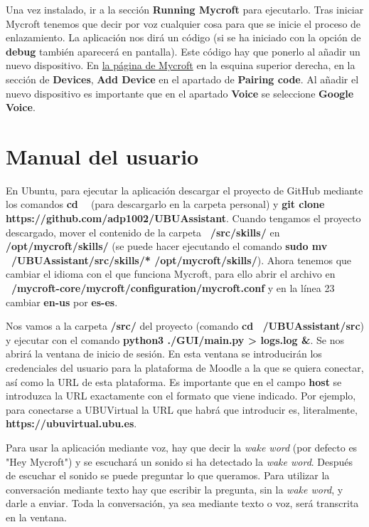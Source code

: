 Una vez instalado, ir a la sección \textbf{Running Mycroft} para ejecutarlo. Tras iniciar Mycroft tenemos que decir por voz cualquier cosa para que se inicie el proceso de enlazamiento. La aplicación nos dirá un código (si se ha iniciado con la opción de \textbf{debug} también aparecerá en pantalla). Este código hay que ponerlo al añadir un nuevo dispositivo. En \href{https://home.mycroft.ai}{la página de Mycroft} en la esquina superior derecha, en la sección de \textbf{Devices}, \textbf{Add Device} en el apartado de \textbf{Pairing code}. Al añadir el nuevo dispositivo es importante que en el apartado \textbf{Voice} se seleccione \textbf{Google Voice}.


\section{Manual del usuario}

En Ubuntu, para ejecutar la aplicación descargar el proyecto de GitHub mediante los comandos \textbf{cd ~} (para descargarlo en la carpeta personal) y \textbf{git clone https://github.com/adp1002/UBUAssistant}. Cuando tengamos el proyecto descargado, mover el contenido de la carpeta \textbf{~/src/skills/} en \textbf{/opt/mycroft/skills/} (se puede hacer ejecutando el comando \textbf{sudo mv ~/UBUAssistant/src/skills/* /opt/mycroft/skills/}). Ahora tenemos que cambiar el idioma con el que funciona Mycroft, para ello abrir el archivo en \textbf{~/mycroft-core/mycroft/configuration/mycroft.conf} y en la línea 23 cambiar \textbf{en-us} por \textbf{es-es}.

Nos vamos a la carpeta \textbf{/src/} del proyecto (comando \textbf{cd ~/UBUAssistant/src}) y ejecutar con el comando \textbf{python3 ./GUI/main.py > logs.log \&}. Se nos abrirá la ventana de inicio de sesión. En esta ventana se introducirán los credenciales del usuario para la plataforma de Moodle a la que se quiera conectar, así como la URL de esta plataforma.
Es importante que en el campo \textbf{host} se introduzca la URL exactamente con el formato que viene indicado. Por ejemplo, para conectarse a UBUVirtual la URL que habrá que introducir es, literalmente, \textbf{https://ubuvirtual.ubu.es}.

Para usar la aplicación mediante voz, hay que decir la \textit{wake word} (por defecto es "Hey Mycroft") y se escuchará un sonido si ha detectado la \textit{wake word}. Después de escuchar el sonido se puede preguntar lo que queramos. Para utilizar la conversación mediante texto hay que escribir la pregunta, sin la \textit{wake word}, y darle a enviar. Toda la conversación, ya sea mediante texto o voz, será transcrita en la ventana.

